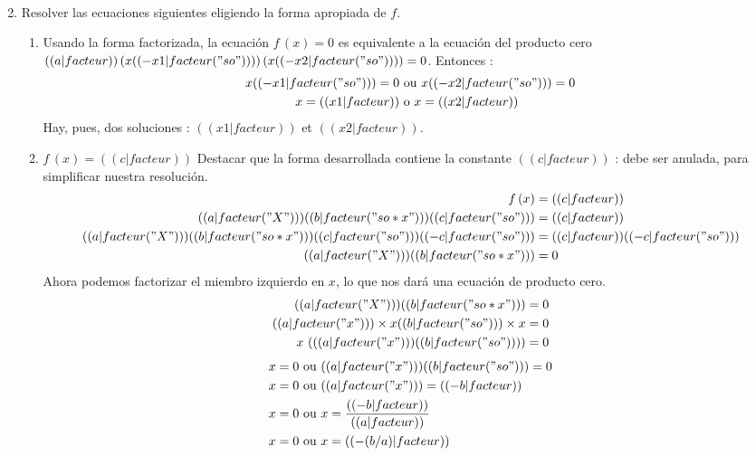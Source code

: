 \begin{enumerate}
\begin{enumerate}
\begin{align*}
        \end{align*}
\end{enumerate}
\item Resolver las ecuaciones siguientes eligiendo la forma apropiada de $f$.
\begin{enumerate}
\item Usando la forma factorizada, la ecuación $f\,(x)=0$ es equivalente a la ecuación del producto cero $(( a|facteur ))\,(x (( -x1|facteur("so") )) )\,(x (( -x2|facteur("so") )) ) = 0$. Entonces :
\begin{align*}
x (( -x1|facteur("so") ))=0 &\text{ ou } x (( -x2|facteur("so") ))=0 \\
x=(( x1|facteur )) &\text{ o } x=(( x2|facteur ))
\end{align*}
Hay, pues, dos soluciones : $(( x1|facteur ))$ et $(( x2|facteur ))$.
\item $f\,(x)=(( c|facteur ))$ Destacar que la forma desarrollada contiene la constante $(( c|facteur ))$ : debe ser anulada, para simplificar nuestra resolución.
\begin{align*}
f\,(x) &= (( c|facteur )) \\
(( a|facteur("X") )) (( b|facteur("so*x") )) (( c|facteur("so") )) &= (( c|facteur )) \\
(( a|facteur("X") )) (( b|facteur("so*x") )) (( c|facteur("so") )) (( -c|facteur("so") )) &= (( c|facteur )) (( -c|facteur("so") )) \\
(( a|facteur("X") )) (( b|facteur("so*x") )) &= 0 \\
\end{align*}
Ahora podemos factorizar el miembro izquierdo en $x$, lo que nos dará una ecuación de producto cero.
\begin{align*}
(( a|facteur("X") )) (( b|facteur("so*x") )) &= 0 \\
(( a|facteur("x") ))\times{} x (( b|facteur("so") ))\times{} x &= 0 \\
x\,\left( (( a|facteur("x") )) (( b|facteur("so") )) \right) &= 0 \\
\end{align*}
\begin{align*}
x =0 &\text{ ou } (( a|facteur("x") )) (( b|facteur("so") ))=0 \\
x =0 &\text{ ou } (( a|facteur("x") )) =(( -b|facteur )) \\
x =0 &\text{ ou } x = \frac{(( -b|facteur ))}{(( a|facteur ))} \\
x =0 &\text{ ou } x = (( -(b/a)|facteur )) \\

\end{align*}
\end{enumerate}
\end{enumerate}
